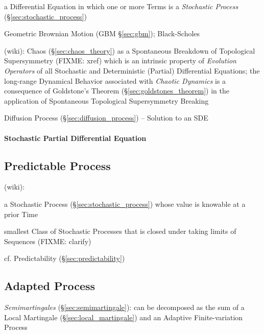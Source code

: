 {a Differential Equation in which one or more Terms is a \emph{Stochastic
  Process} (\S\ref{sec:stochastic_process})

\fist Geometric Brownian Motion (GBM \S\ref{sec:gbm}); Black-Scholes

(wiki): Chaos (\S\ref{sec:chaos_theory}) as a Spontaneous Breakdown of
Topological Supersymmetry (FIXME: xref) which is an intrinsic property of
\emph{Evolution Operators} of all Stochastic and Deterministic (Partial)
Differential Equations; the long-range Dynamical Behavior associated with
\emph{Chaotic Dynamics} is a consequence of Goldstone's Theorem
(\S\ref{sec:goldstones_theorem}) in the application of Spontaneous Topological
Supersymmetry Breaking

Diffusion Process (\S\ref{sec:diffusion_process}) -- Solution to an SDE



\paragraph{Stochastic Partial Differential Equation}\label{sec:spde}\hfill



\subsection{Predictable Process}\label{sec:predictable_process}

(wiki):

a Stochastic Process (\S\ref{sec:stochastic_process}) whose value is knowable at
a prior Time

smallest Class of Stochastic Processes that is closed under taking limits of
Sequences (FIXME: clarify)

cf. Predictability (\S\ref{sec:predictability})



\subsection{Adapted Process}\label{sec:adapted_process}

\fist \emph{Semimartingales} (\S\ref{sec:semimartingale}): can be decomposed as
the sum of a Local Martingale (\S\ref{sec:local_martingale}) and an Adaptive
Finite-variation Process



}
